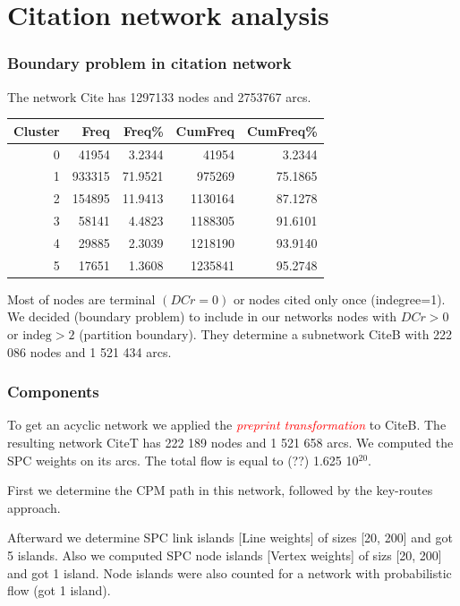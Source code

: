 \documentclass[hyperref={pdfstartview={FitBH -32768},
                         pdfpagemode=FullScreen,
                         plainpages=false,
                         colorlinks=true}
              ]{beamer}
\newcommand{\keyw}[1]{\textcolor{red}{\emph{#1}}}
\newcommand{\indeg}{\mbox{indeg}}
\begin{document}
\section{Citation network analysis}  


\begin{frame}[fragile]
\frametitle{Boundary problem in citation network}
\small 

The network Cite has 1297133  nodes and 2753767 arcs.
\medskip

\begin{tabular}{r|r|r|r|r|}
 Cluster &       Freq &    Freq\%  &  CumFreq &  CumFreq\% \\ \hline
 0     & 41954   &  3.2344     & 41954   &  3.2344  \\ 
1   &  933315  &  71.9521   &  975269  & 75.1865  \\
2   &  154895   & 11.9413   & 1130164  &  87.1278 \\
3   &  58141    & 4.4823   & 1188305   & 91.6101  \\ 
4   &  29885   & 2.3039  & 1218190  & 93.9140 \\  
5   &  17651   & 1.3608   & 1235841  & 95.2748  \\ \hline
\end{tabular}

\medskip

Most of nodes are terminal $(DCr=0)$ or nodes cited only once (indegree=1). We decided (boundary problem) to include in our networks nodes with $DCr > 0$ or $\indeg > 2$ (partition boundary). They determine a subnetwork CiteB with  222 086 nodes and 1 521 434 arcs.

\end{frame}

\begin{frame}[fragile]
\frametitle{Components}
\small 
To get an acyclic network we applied the \keyw{preprint transformation} to CiteB. The resulting network CiteT has 222 189 nodes and 1 521 658 arcs. 
 We computed the SPC weights on its arcs. The total flow is equal to (??) 1.625 10$^{20}$.\medskip

First we determine the CPM path in this network, followed by the key-routes approach. \medskip

Afterward we determine SPC link islands [Line weights] of sizes [20, 200] and got 5 islands. Also we computed SPC node islands [Vertex weights] of sizs  [20, 200] and got 1 island. Node islands were also counted for a network with probabilistic flow (got 1 island). 

\end{frame}
\end{document}
